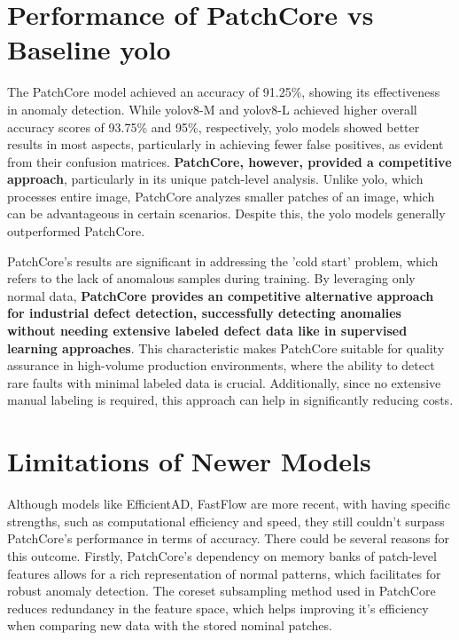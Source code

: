 \section*{Performance of PatchCore vs Baseline \gls{yolo}}

The PatchCore model achieved an accuracy of 91.25\%, showing its effectiveness in anomaly detection. While \gls{yolo}v8-M and \gls{yolo}v8-L achieved higher overall accuracy scores of 93.75\% and 95\%, respectively, \gls{yolo} models showed better results in most aspects, particularly in achieving fewer false positives, as evident from their confusion matrices. \textbf{PatchCore, however, provided a competitive approach}, particularly in its unique patch-level analysis. Unlike \gls{yolo}, which processes entire image, PatchCore analyzes smaller patches of an image, which can be advantageous in certain scenarios. Despite this, the \gls{yolo} models generally outperformed PatchCore.

PatchCore's results are significant in addressing the 'cold start' problem, which refers to the lack of anomalous samples during training. By leveraging only normal data, \textbf{PatchCore provides an competitive alternative approach for industrial defect detection, successfully detecting anomalies without needing extensive labeled defect data like in supervised learning approaches}. This characteristic makes PatchCore suitable for quality assurance in high-volume production environments, where the ability to detect rare faults with minimal labeled data is crucial. Additionally, since no extensive manual labeling is required, this approach can help in significantly reducing costs.

\section*{Limitations of Newer Models}

Although models like EfficientAD, FastFlow are more recent, with having specific strengths, such as computational efficiency and speed, they still couldn't surpass PatchCore's performance in terms of accuracy. There could be several reasons for this outcome. Firstly, PatchCore's dependency on memory banks of patch-level features allows for a rich representation of normal patterns, which facilitates for robust anomaly detection. The coreset subsampling method used in PatchCore reduces redundancy in the feature space, which helps improving it's efficiency when comparing new data with the stored nominal patches.

